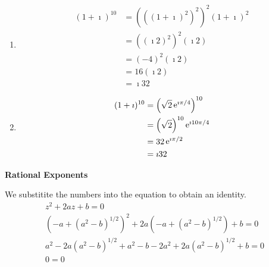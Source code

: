 {%
\begin{Solution}
  \label{solution (1+i)10}
  \begin{enumerate}
  \item
    \begin{align*}
      (1 + \imath)^{10}
      &= \left( \left( (1 + \imath)^2 \right)^2 \right)^2 (1 + \imath)^2 
      \\
      &= \left( \left( \imath 2 \right)^2 \right)^2 (\imath 2) 
      \\
      &= \left( -4 \right)^2 (\imath 2) 
      \\
      &= 16 (\imath 2) 
      \\
      &= \imath 32
    \end{align*}
  \item
    \begin{align*}
      (1 + \imath)^{10}
      &= \left( \sqrt{2} \mathop{\mathrm{e}}\nolimits^{\imath \pi/4} \right)^{10} 
      \\
      &= \left( \sqrt{2} \right)^{10} \mathop{\mathrm{e}}\nolimits^{\imath 10 \pi/4} 
      \\
      &= 32 \mathop{\mathrm{e}}\nolimits^{\imath \pi/2} 
      \\
      &= \imath 32
    \end{align*}
  \end{enumerate}
\end{Solution}




\begin{large}
  \noindent
  \textbf{Rational Exponents}
\end{large}



\begin{Solution}
  \label{solution z2 + 2az + b = 0}
  We substitite the numbers into the equation to obtain an identity.
  \begin{gather*}
    z^2 + 2 a z + b = 0 
    \\
    \left( -a + \left( a^2 - b \right)^{1/2} \right)^2 
    + 2 a \left( -a + \left( a^2 - b \right)^{1/2} \right) + b = 0 
    \\
    a^2 -2 a \left( a^2 - b \right)^{1/2} + a^2 - b - 2 a^2 
    + 2 a \left( a^2 - b \right)^{1/2} + b = 0 
    \\
    0 = 0
  \end{gather*}
\end{Solution}









\raggedbottom

}

